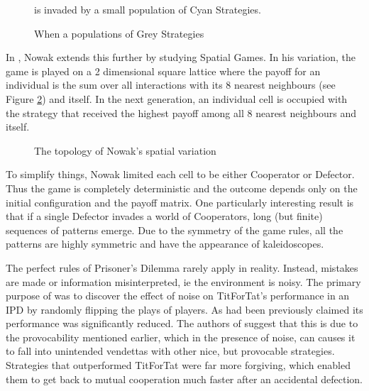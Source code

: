 \begin{figure}[tb]
    \centering
    
    \caption{When a populations of \textcolor{sol-base1}{Grey Strategies}} is invaded by a small population of \textcolor{sol-cyan}{Cyan Strategies}.
    \label{fig:evol_stable}
\end{figure}

In \cite{Nowak1992, Nowak1993, Nowak1994}, Nowak extends this further by studying Spatial Games.
In his variation, the game is played on a 2 dimensional square lattice where the payoff for an individual is the sum over all interactions with its 8 nearest neighbours (see Figure \ref{fig:nowak_spatial}) and itself.
In the next generation, an individual cell is occupied with the strategy that received the highest payoff among all 8 nearest neighbours and itself.

\begin{figure}[hbtp!]
    \centering
    \caption{The topology of Nowak's spatial variation}
    \label{fig:nowak_spatial}
\end{figure}

To simplify things, Nowak limited each cell to be either Cooperator or Defector.
Thus the game is completely deterministic and the outcome depends only on the initial configuration and the payoff matrix.
One particularly interesting result is that if a single Defector invades a world of Cooperators, long (but finite) sequences of patterns emerge.
Due to the symmetry of the game rules, all the patterns are highly symmetric and have the appearance of kaleidoscopes.

The perfect rules of Prisoner's Dilemma rarely apply in reality.
Instead, mistakes are made or information misinterpreted, ie the environment is noisy.
The primary purpose of \cite{Bendor1991} was to discover the effect of noise on TitForTat's performance in an IPD by randomly flipping the plays of players.
As had been previously claimed its performance was significantly reduced.
The authors of \cite{Bendor1991} suggest that this is due to the provocability mentioned earlier, which in the presence of noise, can causes it to fall into unintended vendettas with other nice, but provocable strategies.
Strategies that outperformed TitForTat were far more forgiving, which enabled them to get back to mutual cooperation much faster after an accidental defection.



